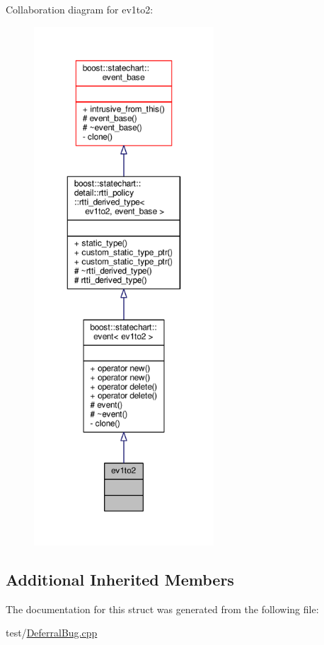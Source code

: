 Collaboration diagram for ev1to2\+:
\nopagebreak
\begin{figure}[H]
\begin{center}
\leavevmode
\includegraphics[height=550pt]{structev1to2__coll__graph}
\end{center}
\end{figure}
\subsection*{Additional Inherited Members}


The documentation for this struct was generated from the following file\+:\begin{DoxyCompactItemize}
\item 
test/\mbox{\hyperlink{_deferral_bug_8cpp}{Deferral\+Bug.\+cpp}}\end{DoxyCompactItemize}
